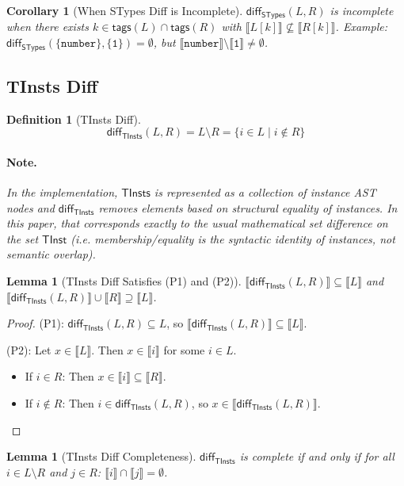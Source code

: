 \documentclass[11pt]{article}
\newtheorem{lemma}[theorem]{Lemma}
\newtheorem{definition}[theorem]{Definition}
\newtheorem{corollary}[theorem]{Corollary}
\newcommand{\sem}[1]{\llbracket #1 \rrbracket}
\newcommand{\diff}{\mathsf{diff}}
\newcommand{\STypes}{\mathsf{STypes}}
\newcommand{\TInst}{\mathsf{TInst}}
\newcommand{\TInsts}{\mathsf{TInsts}}
\newcommand{\tags}{\mathsf{tags}}
\begin{document}
\begin{corollary}[When STypes Diff is Incomplete]
$\diff_{\STypes}(L, R)$ is incomplete when there exists $k \in \tags(L) \cap \tags(R)$ with $\sem{L[k]} \not\subseteq \sem{R[k]}$.
Example: $\diff_{\STypes}(\{\texttt{number}\}, \{\texttt{1}\}) = \emptyset$, 
but $\sem{\texttt{number}} \setminus \sem{\texttt{1}} \neq \emptyset$.
\end{corollary}

\subsection{TInsts Diff}

\begin{definition}[TInsts Diff]
\label{def:tinsts-diff}
\[
\diff_{\TInsts}(L, R) = L \setminus R = \{ i \in L \mid i \notin R \}
\]
\paragraph{Note.}
In the implementation, $\TInsts$ is represented as a collection of instance AST nodes and $\diff_{\TInsts}$ removes elements based on \emph{structural equality} of instances.
In this paper, that corresponds exactly to the usual mathematical set difference on the set $\TInst$ (i.e. membership/equality is the syntactic identity of instances, not semantic overlap).
\end{definition}

\begin{lemma}[TInsts Diff Satisfies (P1) and (P2)]
\label{lem:tinsts-diff-sound}
$\sem{\diff_{\TInsts}(L, R)} \subseteq \sem{L}$ and 
$\sem{\diff_{\TInsts}(L, R)} \cup \sem{R} \supseteq \sem{L}$.
\end{lemma}

\begin{proof}
(P1): $\diff_{\TInsts}(L, R) \subseteq L$, so $\sem{\diff_{\TInsts}(L, R)} \subseteq \sem{L}$.

(P2): Let $x \in \sem{L}$. Then $x \in \sem{i}$ for some $i \in L$.
\begin{itemize}
\item If $i \in R$: Then $x \in \sem{i} \subseteq \sem{R}$.
\item If $i \notin R$: Then $i \in \diff_{\TInsts}(L, R)$, so $x \in \sem{\diff_{\TInsts}(L, R)}$.
\end{itemize}
\end{proof}

\begin{lemma}[TInsts Diff Completeness]
\label{lem:tinsts-diff-complete}
$\diff_{\TInsts}$ is complete if and only if for all $i \in L \setminus R$ and $j \in R$:
$\sem{i} \cap \sem{j} = \emptyset$.
\end{lemma}
\end{document}
